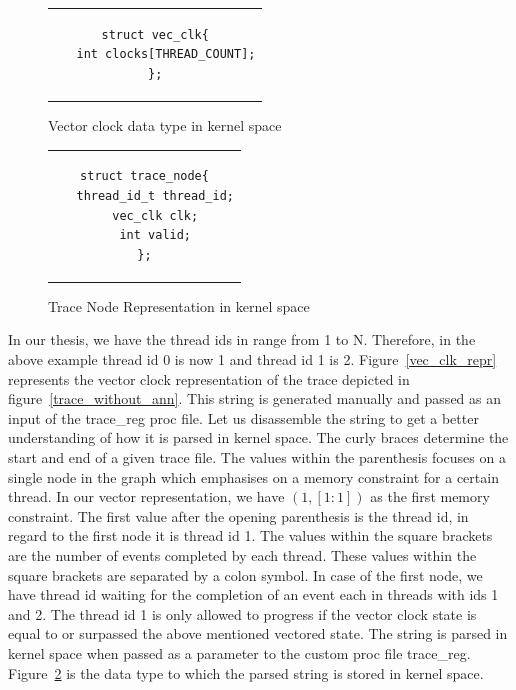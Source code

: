 \begin{figure}[h]
\centering
\begin{tabular}{c}
\begin{lstlisting}
struct vec_clk{
   int clocks[THREAD_COUNT];
};
\end{lstlisting}
\end{tabular}
\caption{Vector clock data type in kernel space}
\label{vec_clk_datatype}
\end{figure}

\begin{figure}[h]
\centering
\begin{tabular}{c}
\begin{lstlisting}
struct trace_node{
   thread_id_t thread_id;
   vec_clk clk;
   int valid;
};
\end{lstlisting}
\end{tabular}
\caption{Trace Node Representation in kernel space}
\label{trace_node_datatype}
\end{figure}



In our thesis, we have the thread ids in range from 1 to N. 
Therefore, in the above example thread id 0 is now 1 and thread id 1 is 2. 
Figure~\ref{vec_clk_repr} represents the vector clock representation of the trace depicted in figure~\ref{trace_without_ann}. 
This string is generated manually and passed as an input of the trace\_reg proc file. 
Let us disassemble the string to get a better understanding of how it is parsed in kernel space. 
The curly braces determine the start and end of a given trace file. 
The values within the parenthesis focuses on a single node in the graph which emphasises on a memory constraint for a certain thread. 
In our vector representation, we have $(1,[1:1])$ as the first memory constraint. 
The first value after the opening parenthesis is the thread id, in regard to the first node it is thread id 1. 
The values within the square brackets are the number of events completed by each thread. 
These values within the square brackets are separated by a colon symbol. 
In case of the first node, we have thread id waiting for the completion of an event each in threads with ids 1 and 2. 
The thread id 1 is only allowed to progress if the vector clock state is equal to or surpassed the above mentioned vectored state. 
The string is parsed in kernel space when passed as a parameter to the custom proc file trace\_reg. 
Figure~\ref{trace_node_datatype} is the data type to which the parsed string is stored in kernel space. 


